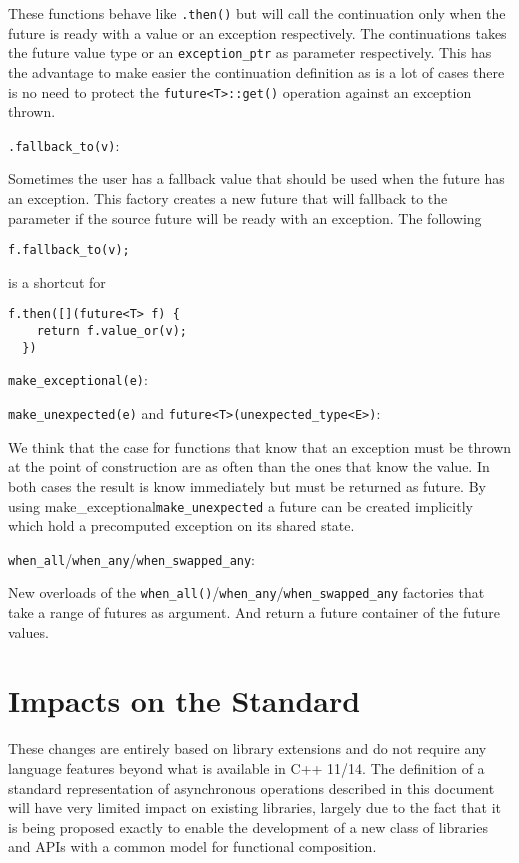 \documentclass[a4paper,10pt]{article}
\newcommand{\cpp}[1]{\lstinline{#1}}
\newcommand{\suppress}[1]{\colorbox{suppress_color}{#1}}
\newcommand{\update}[1]{\colorbox{update_color}{#1}}
\begin{document}
These functions behave like \cpp{.then()} but will call the continuation only when the future is ready with a value or an exception respectively. The continuations takes the future value type or an \cpp{exception_ptr} as parameter respectively. This has the advantage to make easier the continuation definition as is a lot of cases there is no need to protect the \cpp{future<T>::get()} operation against an exception thrown.

\cpp{.fallback_to(v)}:

Sometimes the user has a fallback value that should be used when the future has an exception. This factory creates a new future that will fallback to the parameter if the source future will be ready with an exception. The following 

\begin{lstlisting}[xleftmargin=0pt]
  f.fallback_to(v);
\end{lstlisting}

is a shortcut for 

\begin{lstlisting}[xleftmargin=0pt]
  f.then([](future<T> f) {
    return f.value_or(v);
  })
\end{lstlisting}

\suppress{
\cpp{make_exceptional(e)}:
}

\update{
\cpp{make_unexpected(e)} and \cpp{future<T>(unexpected_type<E>)}:
}

We think that the case for functions that know that an exception must be thrown at the point of construction are as often than the ones that know the value. In both cases the result is know immediately but must be returned as future. By using \suppress{make_exceptional}\update{\cpp{make_unexpected}} a future can be created implicitly which hold a precomputed exception on its shared state.  

\cpp{when_all}/\/\cpp{when_any}/\cpp{when_swapped_any}:

New overloads of the \cpp{when_all()}/\cpp{when_any}/\cpp{when_swapped_any} factories that take a range of futures as argument. And return a future container of the future values.

\section{Impacts on the Standard}

These changes are entirely based on library extensions and do not require any language features beyond what is available in C++ 11/14. The definition of a standard representation of asynchronous operations described in this document will have very limited impact on existing libraries, largely due to the fact that it is being proposed exactly to enable the development of a new class of libraries and APIs with a common model for functional composition. 
\end{document}
